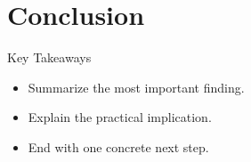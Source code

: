 \documentclass[aspectratio=169]{beamer}
\begin{document}
\section{Conclusion}

\begin{frame}{Key Takeaways}
  \begin{itemize}
    \item Summarize the most important finding.
    \item Explain the practical implication.
    \item End with one concrete next step.
  \end{itemize}
\end{frame}

\PKUAcknowledgementsFrame
\end{document}
